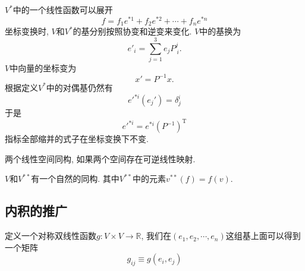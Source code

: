 
$V^{*}$中的一个线性函数可以展开
\begin{equation}
  f = f_1 e^{*1} + f_2 e^{*2} + \cdots + f_n e^{*n}
\end{equation}
坐标变换时, $V$和$V^{*}$的基分别按照协变和逆变来变化. $V$中的基换为
\begin{equation}
  e'_{i} = \sum_{j=1}^{3} e_j P^{j} _{\ i}.
\end{equation}
$V$中向量的坐标变为
\begin{equation}
  x' = P^{-1} x.
\end{equation}
根据定义$V^{*}$中的对偶基仍然有
\begin{equation}
  {e'}^{*i} \left( e_{j}' \right) = \delta_{j}^{i}
\end{equation}
于是
\begin{equation}
  {e'}^{*i} =e^{*i}  \left( P^{-1} \right) ^{\mathrm{T}}
\end{equation}
指标全部缩并的式子在坐标变换下不变.

\begin{definition}
    两个线性空间同构, 如果两个空间存在可逆线性映射.
\end{definition}
\begin{proposition}
    $V$和$V^{* *}$有一个自然的同构. 其中$V^{* *}$中的元素$v^{* *}\left( f \right) = f\left( v \right) $.
\end{proposition}

\subsection{内积的推广}
定义一个对称双线性函数$g\colon V \times V \to \mathbb{R}$, 我们在$\left( e_1,e_2,\cdots,e_n \right) $这组基上面可以得到一个矩阵
\begin{equation}
  g_{ij} \equiv g\left( e_i, e_j \right) 
\end{equation}